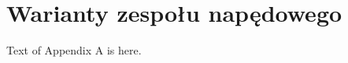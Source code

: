 \appendix
\chapter{Warianty zespołu napędowego}
\label{appA_warianty_zespolu_napedowego}

Text of Appendix A is here.